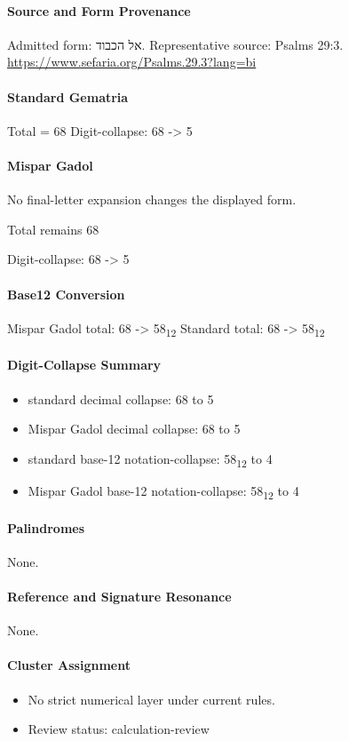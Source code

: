 \paragraph{Source and Form Provenance}
Admitted form: אל הכבוד.
Representative source: Psalms 29:3.
\url{https://www.sefaria.org/Psalms.29.3?lang=bi}
\paragraph{Standard Gematria}
Total = 68
Digit-collapse: 68 -> 5
\paragraph{Mispar Gadol}
No final-letter expansion changes the displayed form.

Total remains 68

Digit-collapse: 68 -> 5
\paragraph{Base12 Conversion}
Mispar Gadol total: 68 -> 58\textsubscript{12}
Standard total: 68 -> 58\textsubscript{12}
\paragraph{Digit-Collapse Summary}
\begin{itemize}
\item standard decimal collapse: 68 to 5
\item Mispar Gadol decimal collapse: 68 to 5
\item standard base-12 notation-collapse: 58\textsubscript{12} to 4
\item Mispar Gadol base-12 notation-collapse: 58\textsubscript{12} to 4
\end{itemize}
\paragraph{Palindromes}
None.
\paragraph{Reference and Signature Resonance}
None.
\paragraph{Cluster Assignment}
\begin{itemize}
\item No strict numerical layer under current rules.
\item Review status: calculation-review
\end{itemize}
